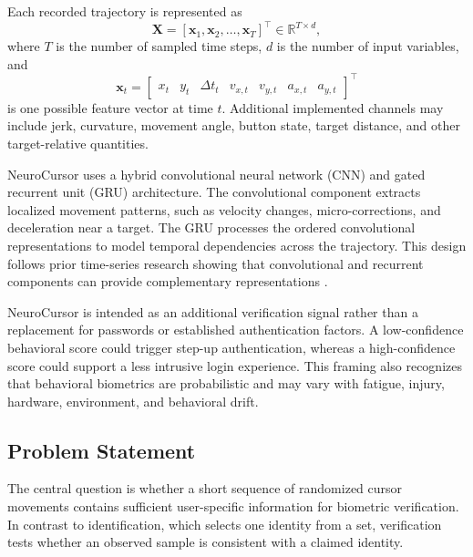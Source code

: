 \documentclass[conference]{IEEEtran}
\begin{document}
Each recorded trajectory is represented as
\begin{equation}
\mathbf{X}
=
\left[
\mathbf{x}_1,
\mathbf{x}_2,
\ldots,
\mathbf{x}_T
\right]^{\top}
\in
\mathbb{R}^{T \times d},
\label{eq:trajectory_matrix}
\end{equation}
where $T$ is the number of sampled time steps, $d$ is the number of input
variables, and
\begin{equation}
\mathbf{x}_t =
\begin{bmatrix}
x_t &
y_t &
\Delta t_t &
v_{x,t} &
v_{y,t} &
a_{x,t} &
a_{y,t}
\end{bmatrix}^{\top}
\label{eq:trajectory_vector}
\end{equation}
is one possible feature vector at time $t$. Additional implemented channels
may include jerk, curvature, movement angle, button state, target distance,
and other target-relative quantities.

NeuroCursor uses a hybrid convolutional neural network (CNN) and gated
recurrent unit (GRU) architecture. The convolutional component extracts
localized movement patterns, such as velocity changes, micro-corrections,
and deceleration near a target. The GRU processes the ordered convolutional
representations to model temporal dependencies across the trajectory. This
design follows prior time-series research showing that convolutional and
recurrent components can provide complementary representations
\cite{foumaniTimeSeriesSurvey,elsayedGRUFCN}.

NeuroCursor is intended as an additional verification signal rather than a
replacement for passwords or established authentication factors. A
low-confidence behavioral score could trigger step-up authentication,
whereas a high-confidence score could support a less intrusive login
experience. This framing also recognizes that behavioral biometrics are
probabilistic and may vary with fatigue, injury, hardware, environment, and
behavioral drift.

\subsection{Problem Statement}

The central question is whether a short sequence of randomized cursor
movements contains sufficient user-specific information for biometric
verification. In contrast to identification, which selects one identity from
a set, verification tests whether an observed sample is consistent with a
claimed identity.
\end{document}
